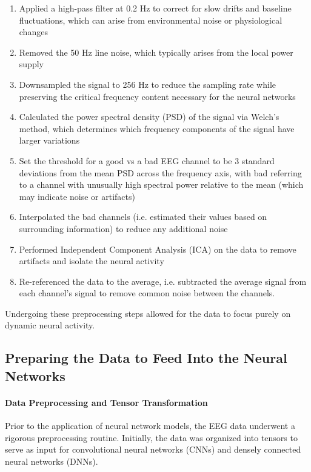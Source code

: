 \documentclass[fleqn,10pt]{SelfArx} %
\begin{document}
    \begin{enumerate}
        \item Applied a high-pass filter at 0.2 Hz to correct for slow drifts and baseline fluctuations, which can arise from environmental noise or physiological changes
        \item Removed the 50 Hz line noise,  which typically arises from the local power supply
        \item Downsampled the signal to 256 Hz to reduce the sampling rate while preserving the critical frequency content necessary for the neural networks
        \item Calculated the power spectral density (PSD) of the signal via Welch’s method, which determines which frequency components of the signal have larger variations
        \item Set the threshold for a good vs a bad EEG channel to be 3 standard deviations from the mean PSD across the frequency axis, with bad referring to a channel with unusually high spectral power relative to the mean (which may indicate noise or artifacts)
        \item Interpolated the bad channels (i.e. estimated their values based on surrounding information) to reduce any additional noise 
        \item Performed Independent Component Analysis (ICA) on the data to remove artifacts and isolate the neural activity
        \item Re-referenced the data to the average, i.e. subtracted the average signal from each channel’s signal to remove common noise between the channels.
    \end{enumerate}
    
Undergoing these preprocessing steps allowed for the data to focus purely on dynamic neural activity.

\subsection{Preparing the Data to Feed Into the Neural Networks}

\paragraph{Data Preprocessing and Tensor Transformation}
Prior to the application of neural network models, the EEG data underwent a rigorous preprocessing routine. Initially, the data was organized into tensors to serve as input for convolutional neural networks (CNNs) and densely connected neural networks (DNNs).
\end{document}
